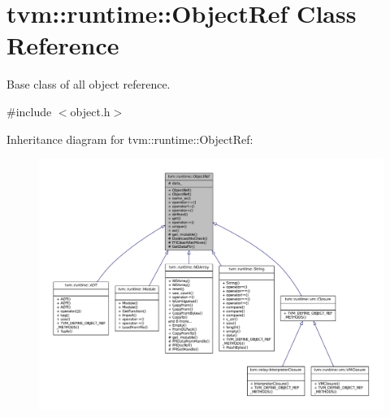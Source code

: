 \hypertarget{classtvm_1_1runtime_1_1ObjectRef}{}\section{tvm\+:\+:runtime\+:\+:Object\+Ref Class Reference}
\label{classtvm_1_1runtime_1_1ObjectRef}


Base class of all object reference.  




{\ttfamily \#include $<$object.\+h$>$}



Inheritance diagram for tvm\+:\+:runtime\+:\+:Object\+Ref\+:
\nopagebreak
\begin{figure}[H]
\begin{center}
\leavevmode
\includegraphics[width=350pt]{classtvm_1_1runtime_1_1ObjectRef__inherit__graph}
\end{center}
\end{figure}


